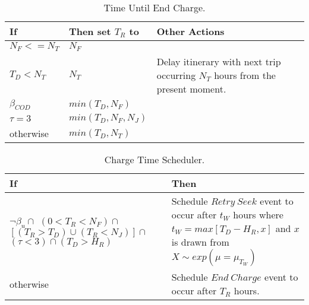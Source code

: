 \documentclass[journal]{IEEEtran}
\begin{document}
\begin{table}[!h]
\def\colmarginA{2cm}
\def\colmarginB{2.5cm}
\def\colmarginC{3cm}
\renewcommand{\arraystretch}{1.3}
\caption{Time Until End Charge.}
\label{tab:timeUntilEndCharge}
\centering
\begin{tabular}{|lll|}
\hline
\textbf{If} & \textbf{Then set $T_R$ to} & \textbf{Other Actions} \\
\hline
\parbox[t]{\colmarginA}{ \raggedright  
    $N_F <= N_T$
  }  & \parbox[t]{\colmarginB}{ \raggedright 
    $N_F$
  }  & \parbox[t]{\colmarginC}{ \raggedright 
} \\
\parbox[t]{\colmarginA}{ \raggedright  
  $T_D < N_T$
  }  & \parbox[t]{\colmarginB}{ \raggedright 
  $N_T$
  }  & \parbox[t]{\colmarginC}{ \raggedright 
  Delay itinerary with next trip occurring $N_T$ hours from the present moment.
} \\
\parbox[t]{\colmarginA}{ \raggedright  
  $\beta_{COD}$
  }  & \parbox[t]{\colmarginB}{ \raggedright 
  $min(T_D,N_F)$
  }  & \parbox[t]{\colmarginC}{ \raggedright 
} \\
\parbox[t]{\colmarginA}{ \raggedright  
  $\tau = 3$
  }  & \parbox[t]{\colmarginB}{ \raggedright 
  $min(T_D,N_F,N_J)$
  }  & \parbox[t]{\colmarginC}{ \raggedright 
} \\
\parbox[t]{\colmarginA}{ \raggedright  
  otherwise
  }  & \parbox[t]{\colmarginB}{ \raggedright 
  $min(T_D,N_T)$
  }  & \parbox[t]{\colmarginC}{ \raggedright 
} \\
\hline
\end{tabular}
\end{table}

\begin{table}[!h]
\def\colmarginA{3.5cm}
\def\colmarginB{4.5cm}
\renewcommand{\arraystretch}{1.3}
\caption{Charge Time Scheduler.}
\label{tab:chargeTimeDecision}
\centering
\begin{tabular}{|ll|}
\hline
\textbf{If} & \textbf{Then} \\
\hline
\parbox[t]{\colmarginA}{ \raggedright  
  $\neg \beta_u \cap$ $(0 < T_R < N_F) \cap$
  $[(T_R > T_D) \cup (T_R < N_J)] \cap$ 
  $(\tau < 3) \cap (T_D > H_R)$
  }  & \parbox[t]{\colmarginB}{ \raggedright Schedule $Retry ~Seek$ event to occur after $t_W$ hours where $t_W = max\left[T_D - H_R, x \right]$ and $x$ is drawn from $X \sim exp(\mu = \mu_{T_W})$
} \\
\parbox[t]{\colmarginA}{ \raggedright  
  otherwise
  }  & \parbox[t]{\colmarginB}{ \raggedright 
  Schedule $End ~Charge$ event to occur after $T_R$ hours.
} \\
\hline
\end{tabular}
\end{table}
\end{document}
